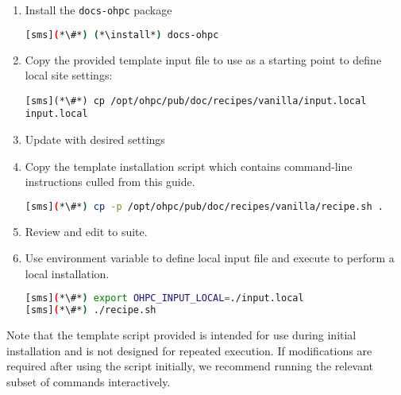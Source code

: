 \begin{enumerate}
\item Install the \texttt{docs-ohpc} package

\begin{lstlisting}[language=bash,keywords={}]
[sms](*\#*) (*\install*) docs-ohpc
\end{lstlisting}

\item Copy the provided template input file to use as a starting point to
  define local site settings:
\begin{lstlisting}
[sms](*\#*) cp /opt/ohpc/pub/doc/recipes/vanilla/input.local input.local
\end{lstlisting}

\item Update  with desired settings

\item Copy the template installation script which contains command-line
  instructions culled from this guide.

\begin{lstlisting}[language=bash,keywords={}]
[sms](*\#*) cp -p /opt/ohpc/pub/doc/recipes/vanilla/recipe.sh .
\end{lstlisting}

\item Review and edit  to suite.

\item Use environment variable to define local input file and execute
   to perform a local installation.

\begin{lstlisting}[language=bash,keywords={}]
[sms](*\#*) export OHPC_INPUT_LOCAL=./input.local
[sms](*\#*) ./recipe.sh
\end{lstlisting}
\end{enumerate}

\vspace*{0.1cm}

\begin{center}
\begin{tcolorbox}[]
\small Note that the template script provided is intended for use during
initial installation and is not designed for repeated execution.  If
modifications are required after using the script initially, we recommend
running the relevant subset of commands interactively.
\end{tcolorbox}
\end{center}
